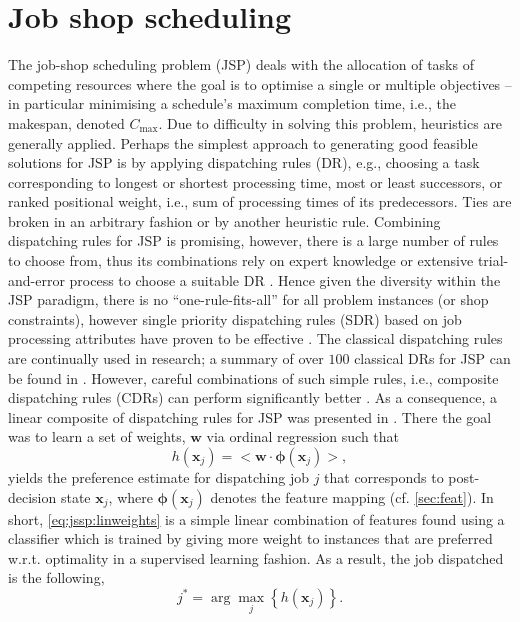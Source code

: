 \documentclass[graybox]{svmult}
\renewcommand{\vec}[1]{\mathbf{#1}}
\newcommand{\vphi}{{\boldsymbol{\phi}}}
\newcommand{\inner}[2]{\big<{#1}\cdot{#2}\big>}
\begin{document}
\section{Job shop scheduling}
The job-shop scheduling problem (JSP) deals with the allocation of tasks of 
competing resources where the goal is to optimise a single or multiple 
objectives -- in particular minimising a schedule's maximum completion time, 
i.e., the makespan, denoted $C_{\max}$. Due to difficulty in solving this 
problem, heuristics are generally applied. Perhaps the simplest approach to 
generating good feasible solutions for JSP is by applying dispatching rules 
(DR),  e.g., choosing a task corresponding to longest or shortest processing 
time, most or least successors, or ranked positional weight, i.e., sum of 
processing times of its predecessors. Ties are broken in an arbitrary fashion 
or by another heuristic rule. Combining dispatching rules for JSP is promising, 
however, there is a large number of rules to choose from, thus its combinations 
rely on expert knowledge or extensive trial-and-error process to choose a 
suitable DR \cite{Tay08}. Hence given the diversity within the JSP paradigm, 
there is no ``one-rule-fits-all'' for all problem instances (or shop 
constraints), however single priority dispatching rules (SDR) based on job 
processing attributes have proven to be effective \cite{Haupt89}. 
The classical dispatching rules are continually used in research; a summary of 
over $100$ classical DRs for JSP can be found in \cite{Panwalkar77}. 
However, careful combinations of such simple rules, i.e., composite dispatching 
rules (CDRs) can perform significantly better \cite{Jayamohan04}. 
As a consequence, a linear composite of dispatching rules for JSP was presented 
in \cite{InRu11a}. There the goal was to learn a set of weights, $\vec{w}$ via 
ordinal regression such that 
\begin{equation}\label{eq:jssp:linweights}
	h(\vec{x}_j)= \inner{\vec{w}}{\vphi(\vec{x}_j)},
\end{equation}
yields the preference estimate for dispatching job $j$ that corresponds to 
post-decision state $\vec{x}_j$, where $\vphi(\vec{x}_j)$ denotes the feature 
mapping (cf. \cref{sec:feat}). 
In short, \cref{eq:jssp:linweights} is a simple linear combination of features 
found using a classifier which is trained by giving more weight to instances 
that are preferred w.r.t. optimality in a supervised learning fashion. As a 
result, the job dispatched is the following, 
\begin{equation}\label{eq:jstar}
	j^* = \arg\max_j\left\{h(\vec{x}_j)\right\}. 
\end{equation}
\end{document}

